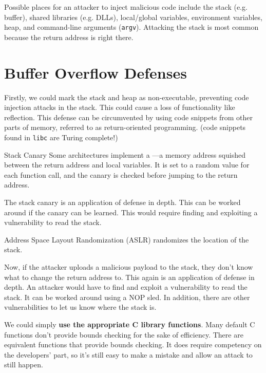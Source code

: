 \documentclass[code]{amznotes}
\begin{document}
Possible places for an attacker to inject malicious code include the stack (e.g. buffer), shared libraries (e.g. DLLs), local/global variables, environment variables, heap, and command-line arguments (\texttt{argv}). Attacking the stack is most common because the return address is right there.

\section{Buffer Overflow Defenses}

Firstly, we could mark the stack and heap as non-executable, preventing code injection attacks in the stack. This could cause a loss of functionality like reflection. This defense can be circumvented by using code snippets from other parts of memory, referred to as return-oriented programming. (code snippets found in \texttt{libc} are Turing complete!)

\begin{dfnbox}{Stack Canary}{}
Some architectures implement a ---a memory address squished between the return address and local variables. It is set to a random value for each function call, and the canary is checked before jumping to the return address.
\end{dfnbox}

The stack canary is an application of defense in depth. This can be worked around if the canary can be learned. This would require finding and exploiting a vulnerability to read the stack.

\begin{dfnbox}{Address Space Layout Randomization (ASLR)}{}
     randomizes the location of the stack.
\end{dfnbox}

Now, if the attacker uploads a malicious payload to the stack, they don't know what to change the return address to. This again is an application of defense in depth. An attacker would have to find and exploit a vulnerability to read the stack. It can be worked around using a NOP sled. In addition, there are other vulnerabilities to let us know where the stack is.

We could simply \textbf{use the appropriate C library functions}. Many default C functions don't provide bounds checking for the sake of efficiency. There are equivalent functions that provide bounds checking. It does require competency on the developers' part, so it's still easy to make a mistake and allow an attack to still happen.
\end{document}
